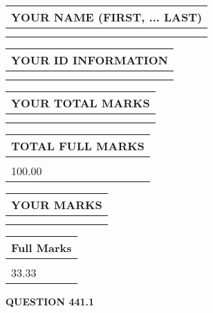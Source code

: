 \documentclass{ctexart}
\begin{document}
   
   
   
\newpage 
\setcounter{page}{ 
   441001 } 
   
   
   
   
\noindent\begin{tabular}{|l|}
\hline
YOUR NAME (FIRST, ... LAST)  \\
\hline
 \\ 
 \\ 
\hline
\end{tabular}
\hspace{0.05in} \begin{tabular}{|l|}
\hline
 YOUR   ID   INFORMATION  \\
\hline
 \\ 
 \\ 
\hline
\end{tabular}
   
   
\vspace{0.2in}\noindent\begin{tabular}{|l|}
\hline
YOUR TOTAL MARKS  \\
\hline
 \\ 
 \\ 
\hline
\end{tabular}
\hspace{0.05in} \begin{tabular}{|l|}
\hline
TOTAL FULL MARKS  \\
\hline
 \\ 
100.00 \\
\hline
\end{tabular}
   
   
 \vspace{0.2in}
 
 
 
 
   
   
  
\vspace{0.2in}
  
\noindent\begin{tabular}{|l|}
\hline
 YOUR MARKS  \\
\hline
 \\ 
 \\ 
\hline
\end{tabular}
\hspace{0.05in} \begin{tabular}{|l|}
\hline
 Full Marks  \\
\hline
 \\ 
33.33 \\
\hline
\end{tabular}
{\textbf{\Large{QUESTION
441.1 
}}}
  
\end{document}

